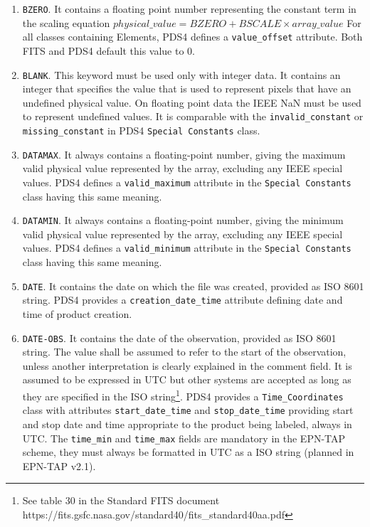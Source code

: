 \begin{enumerate}
\item{\texttt{BZERO}.
It contains a floating point number representing the constant term in the
scaling equation $physical\_value = BZERO + BSCALE \times array\_value$
For all classes containing Elements, PDS4 defines a \texttt{value\_offset}
attribute. Both FITS and PDS4 default this value to $0$.}

\item{\texttt{BLANK}.
This keyword must be used only with integer data.
It contains an integer that specifies the value that is used to
represent pixels that have an undefined physical value.
On floating point data the IEEE NaN must be used to represent undefined values.  
It is comparable with the \texttt{invalid\_constant} or \texttt{missing\_constant}
in PDS4 \texttt{Special Constants} class.}

\item{\texttt{DATAMAX}.
It always contains a floating-point number, giving the maximum valid physical value
represented by the array, excluding any IEEE special values.
PDS4 defines a \texttt{valid\_maximum} attribute in the \texttt{Special Constants} class
having this same meaning.}

\item{\texttt{DATAMIN}.
It always contains a floating-point number, giving the minimum valid physical value
represented by the array, excluding any IEEE special values.
PDS4 defines a \texttt{valid\_minimum} attribute in the \texttt{Special Constants} class
having this same meaning.}

\item{\texttt{DATE}.
It contains the date on which the file was created, provided as ISO 8601
string.
PDS4 provides a \texttt{creation\_date\_time} attribute defining date
and time of product creation.}

\item{\texttt{DATE-OBS}.
It contains the date of the observation, provided as ISO 8601
string. The value shall be assumed to refer to the start of the observation,
unless another interpretation is clearly explained in the comment field.
It is assumed to be expressed in UTC but other systems are accepted as long as they
are specified in the ISO string\footnote{See table 30 in the Standard FITS document https://fits.gsfc.nasa.gov/standard40/fits\_standard40aa.pdf}. 
PDS4 provides a \texttt{Time\_Coordinates} class with attributes
\texttt{start\_date\_time} and \texttt{stop\_date\_time} providing start and
stop date and time appropriate to the product being labeled, always in UTC.
The \texttt{time\_min} and \texttt{time\_max} fields are mandatory in the EPN-TAP
scheme, they must always be formatted in UTC as a ISO string (planned in EPN-TAP v2.1).}


\end{enumerate}

